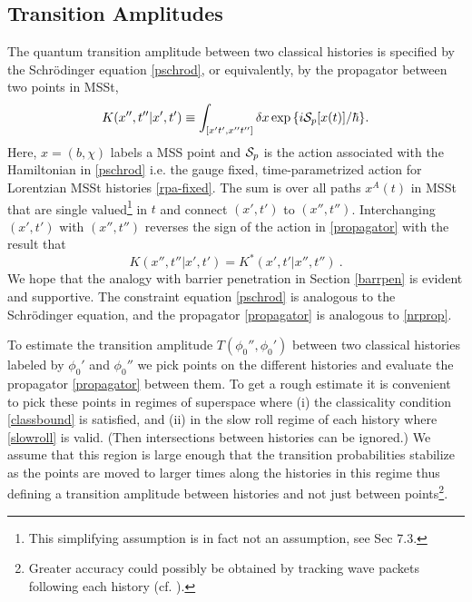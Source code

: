 \documentclass[prd,floats,superscriptaddress,eqsecnum,floatfix,nofootinbib,12pt]{revtex4}
\def\p0{\phi_0}
\def\be{\begin{equation}}
\def\ee{\end{equation}}
\def\j2{}
\def\mf{}
\def\p0{\phi_0}
\begin{document}
{{{{\subsection{Transition Amplitudes}
\label{transamps}

The quantum transition amplitude between two classical histories is specified by the Schr\"odinger equation \eqref{pschrod}, or equivalently, by the propagator between two points in MSSt,
\be
\label{propagator}
K( x'',  t'' | x' , t') \equiv \int_{[x't',x''t'']} \delta x  \exp{\{i {\cal S}_p [x(t)]/\hbar\}} .
\ee
Here, $x =(b,\chi)$ labels a MSS point  and ${\cal S}_p$ is the action associated with the Hamiltonian in \eqref{pschrod} i.e. the gauge fixed, time-parametrized action for Lorentzian MSSt histories \eqref{rpa-fixed}. The sum is over all paths $x^A(t)$  in  MSSt  that are single valued\footnote{This simplifying assumption is in fact not an assumption, see \cite{Har95c} Sec 7.3.} in $t$  and  connect $(x',t')$ to $(x'',t'')$. 
Interchanging $(x',t')$ with $(x'',t'')$ reverses the sign of the action in \eqref{propagator} with the result that 
\be
\label{timerev}
K( x'',  t'' | x' , t') = K^*( x',  t' | x'' , t'') \ .
\ee
{\j2 We hope that the analogy with barrier penetration in Section \ref{barrpen} is evident and supportive. The constraint equation \eqref{pschrod} is analogous to the Schr\"odinger equation, and the propagator \eqref{propagator} is analogous to \eqref{nrprop}.}

{\mf To estimate the transition amplitude $T(\p0'',\p0')$ between two classical histories labeled by $\p0'$ and $\p0''$ we pick points on the different histories and evaluate the propagator \eqref{propagator} between them.  To get a rough estimate  it is convenient to pick these points in regimes of superspace where (i) the classicality condition \eqref{classbound} is satisfied, and (ii) in the slow roll regime of each history where \eqref{slowroll} is valid. (Then intersections between histories can be ignored.) We assume that this region is large enough that the transition probabilities stabilize as the points are moved to larger times along the histories in this regime thus defining a transition amplitude between histories and not just between points\footnote{Greater accuracy could possibly be obtained by tracking wave packets following each history (cf. \cite{Kiefer}). }.}

}}}}
\end{document}
